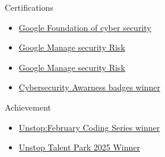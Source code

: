 \documentclass{resume}
\begin{document}
\vspace{-0.2em}
\begin{rSection}{Certifications}
    \begin{itemize}
        \item \href{https://coursera.org/share/dc5df20e6dc55a6b8b97cd5bc2d5d927}{Google Foundation of cyber security}
        \item \href{https://coursera.org/share/f75c0a81532aebe121347db41be1d9e5}{Google Manage security Risk}
        \item \href{https://coursera.org/share/f75c0a81532aebe121347db41be1d9e5}{Google Manage security Risk}

        \item \href{https://app.kajabi.com/certificates/1d00b4fe}{Cybersecurity Awarness badges winner}
    \end{itemize}
    \vspace{-0.4em}
\end{rSection}

\begin{rSection}{Achievement}
    \begin{itemize}
        \item \href{https://unstop.com/certificate-preview/a2c45722-20b1-4708-81ba-74b1874823f1}{Unstop:February Coding Series winner}
        \item \href{https://unstop.com/certificate-preview/a2c45722-20b1-4708-81ba-74b1874823f1}{ Unstop Talent Park 2025 Winner}
    \end{itemize}
\end{rSection}
\vspace{-0.4em}

\end{document}

